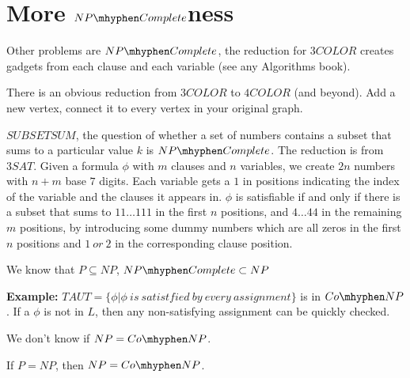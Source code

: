 




\section*{More $NP\mhyphen Complete$ness}

Other problems are $NP\mhyphen Complete$, the reduction for $3COLOR$ creates gadgets from each clause and each variable (see any Algorithms book).

There is an obvious reduction from $3COLOR$ to $4COLOR$ (and beyond).  Add a new vertex, connect it to every vertex in your original graph.

$SUBSETSUM$, the question of whether a set of numbers contains a subset that sums to a particular value $k$ is $NP\mhyphen Complete$.  The reduction is from $3SAT$.  Given a formula $\phi$ with $m$ clauses and $n$ variables, we create $2n$ numbers with $n+m$ base $7$ digits.  Each variable gets a $1$ in positions indicating the index of the variable and the clauses it appears in.  $\phi$ is satisfiable if and only if there is a subset that sums to $11\dots111$ in the first $n$ positions, and $4\dots44$ in the remaining $m$ positions, by introducing some dummy numbers which are all zeros in the first $n$ positions and $1\ or \ 2$ in the corresponding clause position.


We know that $P\subseteq NP$, $NP\mhyphen Complete \subset NP$


\textbf{Example:} $TAUT = \{ \phi | \phi \ is  \ satistfied \ by \ every \ assignment\}$ is in $Co\mhyphen NP$.  If a $\phi$ is not in $L$, then any non-satisfying assignment can be quickly checked.


We don't know if $NP=Co\mhyphen NP$.

If $P=NP$, then $NP = Co\mhyphen NP$.

